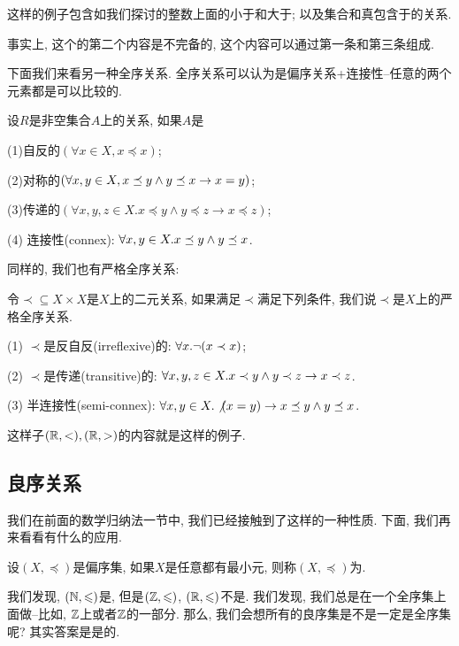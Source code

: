 这样的例子包含如我们探讨的整数上面的小于和大于; 以及集合和真包含于的关系. 


事实上, 这个的第二个内容是不完备的, 这个内容可以通过第一条和第三条组成. 



下面我们来看另一种全序关系. 全序关系可以认为是偏序关系+连接性--任意的两个元素都是可以比较的. 

\begin{definition}
	设$R$是非空集合$A$上的关系, 如果$A$是
	
	(1)自反的$(\forall x\in X, x \preceq x)$;
	
	(2)对称的$(\forall x,y \in X, x \preceq y \land y\preceq x \to x=y)$;
	
	(3)传递的$(\forall x,y,z\in X. x \preceq y \land y \preceq z \to x\preceq z)$;
	
	(4) 连接性(connex): $\forall x, y\in X. x\preceq y\land y\preceq x$. 
\end{definition}

同样的, 我们也有严格全序关系: 

\begin{definition}[严格全序关系]
令$\prec\subseteq X\times X$是$X$上的二元关系, 如果满足$\prec$满足下列条件, 我们说$\prec$是$X$上的严格全序关系.
 
	(1) $\prec$是反自反(irreflexive)的: $\forall x. \lnot (x\prec x)$;
	
	(2) $\prec$是传递(transitive)的: $\forall x,y,z\in X. x\prec y \land y\prec z\to x\prec z$.
	
	(3) 半连接性(semi-connex): $\forall x, y\in X. \not (x=y)\to x\preceq y\land y\preceq x$. 
\end{definition}

这样子$(\mathbb{R}, <), (\mathbb{R},>)$的内容就是这样的例子. 


\subsection{良序关系}

我们在前面的数学归纳法一节中, 我们已经接触到了这样的一种性质. 下面, 我们再来看看有什么的应用. 

\begin{definition}
	设$(X,\preceq)$是偏序集, 如果$X$是任意{}都有最小元, 则称$(X,\preceq)$为{}. 
\end{definition}

我们发现, $(\mathbb{N},\leqslant)$是, 但是$(\mathbb{Z},\leqslant)$, $(\mathbb{R},\leqslant )$不是. 我们发现, 我们总是在一个全序集上面做--比如, $\mathbb{Z}$上或者$\mathbb{Z}$的一部分. 那么, 我们会想所有的良序集是不是一定是全序集呢? 其实答案是是的. 

